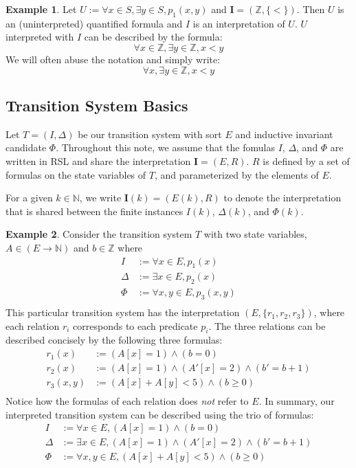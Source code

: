 \documentclass[12pt]{article}
\theoremstyle{definition}
\newtheorem{example}{Example}
\theoremstyle{remark}
\begin{document}
\begin{example}
  Let $U := \forall x \in S, \exists y \in S, p_1(x,y)$ and $\mathbf{I} = (\mathbb{Z}, \{<\})$.  Then $U$ is an (uninterpreted) quantified formula and $I$ is an interpretation of $U$.  $U$ interpreted with $I$ can be described by the formula:
  $$\forall x \in \mathbb{Z}, \exists y \in \mathbb{Z}, x < y$$
  We will often abuse the notation and simply write:
  $$\forall x, \exists y \in \mathbb{Z}, x < y$$
\end{example}


\subsection{Transition System Basics}

Let $T=(I,\Delta)$ be our transition system with sort $E$ and inductive invariant candidate $\Phi$.  Throughout this note, we assume that the fomulas $I$, $\Delta$, and $\Phi$ are written in RSL and share the interpretation $\mathbf{I} = (E, R)$.  $R$ is defined by a set of formulas on the state variables of $T$, and parameterized by the elements of $E$.

For a given $k \in \mathbb{N}$, we write $\mathbf{I}(k) = (E(k), R)$ to denote the interpretation that is shared between the finite instances $I(k)$, $\Delta(k)$, and $\Phi(k)$.

\begin{example}
  Consider the transition system $T$ with two state variables, $A \in (E \to \mathbb{N})$ and $b \in \mathbb{Z}$ where
  \begin{align*}
    I &:= \forall x \in E, p_1(x)\\
    \Delta &:= \exists x \in E, p_2(x)\\
    \Phi &:= \forall x,y \in E, p_3(x,y)\\
  \end{align*}
  This particular transition system has the interpretation $(E,\{r_1,r_2,r_3\})$, where each relation $r_i$ corresponds to each predicate $p_i$.  The three relations can be described concisely by the following three formulas:
  \begin{align*}
    r_1(x) &:= (A[x] = 1) \land (b = 0)\\
    r_2(x) &:= (A[x] = 1) \land (A'[x] = 2) \land (b' = b+1)\\
    r_3(x,y) &:= (A[x] + A[y] < 5) \land (b \geq 0)\\
  \end{align*}
  Notice how the formulas of each relation does \textit{not} refer to $E$.  In summary, our interpreted transition system can be described using the trio of formulas:
  \begin{align*}
    I &:= \forall x \in E, (A[x] = 1) \land (b = 0)\\
    \Delta &:= \exists x \in E, (A[x] = 1) \land (A'[x] = 2) \land (b' = b+1)\\
    \Phi &:= \forall x,y \in E, (A[x] + A[y] < 5) \land (b \geq 0)\\
  \end{align*}
\end{example}
\end{document}
